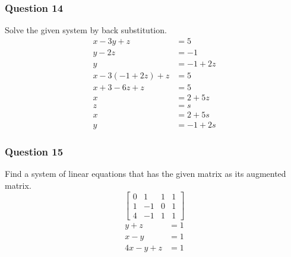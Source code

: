 \documentclass{math}
\begin{document}
\subsubsection*{Question 14}
Solve the given system by back substitution.
\begin{align*}
  x-3y+z &= 5 \\
  y-2z &= -1 \\
  y &= -1+2z \\
  x-3(-1+2z)+z &= 5 \\
  x+3-6z+z &= 5 \\
  x &= 2+5z \\
  z &= s \\
  x &= 2+5s \\
  y &= -1+2s
\end{align*}

\subsubsection*{Question 15}
Find a system of linear equations that has the given matrix as its augmented
matrix.
\[ \begin{bmatrix}
  0 & 1 & 1 & 1 \\
  1 & -1 & 0 & 1 \\
  4 & -1 & 1 & 1
\end{bmatrix} \]
\begin{align*}
  y+z &= 1 \\
  x-y &= 1 \\
  4x-y+z &= 1
\end{align*}
\end{document}
